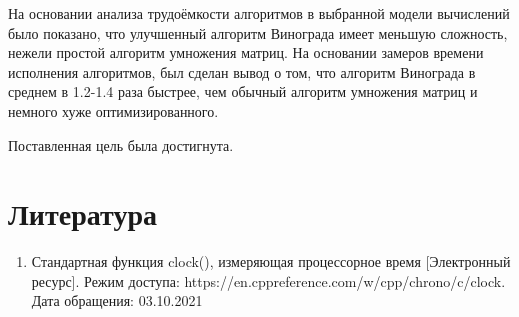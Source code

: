 \documentclass[12pt]{report}
\begin{document}
На основании анализа трудоёмкости алгоритмов в выбранной модели вычислений было показано, что улучшенный алгоритм Винограда имеет меньшую сложность, нежели простой алгоритм умножения матриц. На основании замеров времени исполнения алгоритмов, был сделан вывод о том, что алгоритм Винограда в среднем в 1.2-1.4 раза быстрее, чем обычный алгоритм умножения матриц и немного хуже оптимизированного. 

Поставленная цель была достигнута.

\chapter*{Литература}
\begin{enumerate}
	\item Стандартная функция clock(), измеряющая процессорное время [Электронный ресурс]. Режим доступа: https://en.cppreference.com/w/cpp/chrono/c/clock. Дата обращения: 03.10.2021
\end{enumerate}
\end{document}
